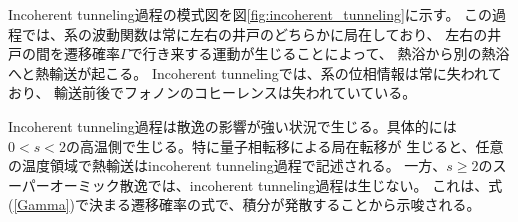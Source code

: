 Incoherent tunneling過程の模式図を図\ref{fig:incoherent_tunneling}に示す。
この過程では、系の波動関数は常に左右の井戸のどちらかに局在しており、
左右の井戸の間を遷移確率$\Gamma$で行き来する運動が生じることによって、
熱浴から別の熱浴へと熱輸送が起こる。
Incoherent tunnelingでは、系の位相情報は常に失われており、
輸送前後でフォノンのコヒーレンスは失われていている。

Incoherent tunneling過程は散逸の影響が強い状況で生じる。具体的には
$0<s<2$の高温側で生じる。特に量子相転移による局在転移が
生じると、任意の温度領域で熱輸送はincoherent tunneling過程で記述される。
一方、$s\geq2$のスーパーオーミック散逸では、incoherent tunneling過程は生じない。
これは、式(\ref{Gamma})で決まる遷移確率の式で、積分が発散することから示唆される。